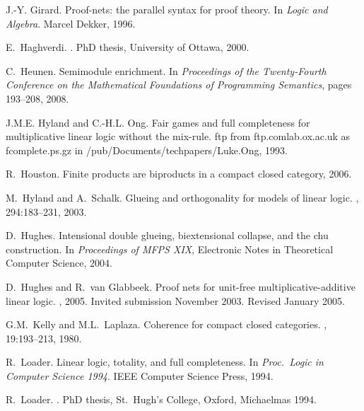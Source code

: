 \documentclass{LMCS}
\theoremstyle{plain}\newtheorem*{cLm}{Claim}
\begin{document}
\begin{thebibliography}{DHPP99}
J.-Y. Girard.
\newblock Proof-nets: the parallel syntax for proof theory.
\newblock In {\em Logic and Algebra}. Marcel Dekker, 1996.

E.~Haghverdi.
.
\newblock PhD thesis, University of Ottawa, 2000.

C.~Heunen.
\newblock Semimodule enrichment.
\newblock In {\em Proceedings of the Twenty-Fourth Conference on the
  Mathematical Foundations of Programming Semantics}, pages 193--208, 2008.

J.M.E. Hyland and C.-H.L. Ong.
\newblock Fair games and full completeness for multiplicative linear logic
  without the mix-rule.
\newblock ftp from ftp.comlab.ox.ac.uk as fcomplete.ps.gz in
  /pub/Documents/techpapers/Luke.Ong, 1993.

R.~Houston.
\newblock Finite products are biproducts in a compact closed category, 2006.

M.\ Hyland and A.\ Schalk.
\newblock Glueing and orthogonality for models of linear logic.
, 294:183--231, 2003.

D.~Hughes.
\newblock Intensional double glueing, biextensional collapse, and the chu
  construction.
\newblock In {\em Proceedings of {MFPS} {XIX}}, Electronic Notes in Theoretical
  Computer Science, 2004.

D.~Hughes and R.~van Glabbeek.
\newblock Proof nets for unit-free multiplicative-additive linear logic.
, 2005.
\newblock Invited submission November 2003. Revised January 2005.

G.M.\ Kelly and M.L.\ Laplaza.
\newblock Coherence for compact closed categories.
, 19:193--213, 1980.

R.~Loader.
\newblock Linear logic, totality, and full completeness.
\newblock In {\em Proc.\ Logic in Computer Science 1994}. IEEE Computer Science
  Press, 1994.

R.~Loader.
.
\newblock PhD thesis, St.~Hugh's College, Oxford, Michaelmas 1994.


\end{thebibliography}
\end{document}
